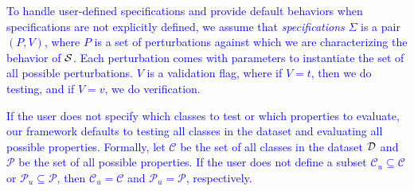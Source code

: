 \textcolor{blue}{
To handle user-defined specifications and provide default behaviors when specifications are not explicitly defined, we assume that \emph{specifications} $\Sigma$ is a pair $(P, V)$, where $P$ is a set of perturbations against which we are characterizing the behavior of $\S$. Each perturbation comes with parameters to instantiate the set of all possible perturbations. $V$ is a validation flag, where if $V=t$, then we do testing, and if $V=v$, we do verification.}

\textcolor{blue}{If the user does not specify which classes to test or which properties to evaluate, our framework defaults to testing all classes in the dataset and evaluating all possible properties. Formally, let $\mathcal{C}$ be the set of all classes in the dataset $\D$ and $\mathcal{P}$ be the set of all possible properties. If the user does not define a subset $\mathcal{C}_u \subseteq \mathcal{C}$ or $\mathcal{P}_u \subseteq \mathcal{P}$, then $\mathcal{C}_u = \mathcal{C}$ and $\mathcal{P}_u = \mathcal{P}$, respectively.
}

    







